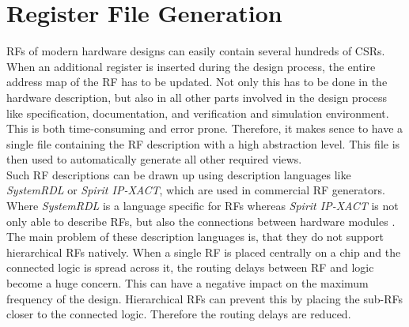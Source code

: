 \section{Register File Generation}
RFs of modern hardware designs can easily contain several hundreds of CSRs. When an additional register is inserted during the design process, the entire address map of the RF has to be updated. Not only this has to be done in the hardware description, but also in all other parts involved in the design process like specification, documentation, and verification and simulation environment. This is both time-consuming and error prone. Therefore, it makes sence to have a single file containing the RF description with a high abstraction level. This file is then used to automatically generate all other required views.\\

Such RF descriptions can be drawn up using description languages like \emph{SystemRDL} or \emph{Spirit IP-XACT}, which are used in commercial RF generators. Where \emph{SystemRDL} is a language specific for RFs \cite{system_rdl} whereas \emph{Spirit IP-XACT} is not only able to describe RFs, but also the connections between hardware modules \cite{ip_xact}.\\

The main problem of these description languages is, that they do not support hierarchical RFs natively. When a single RF is placed centrally on a chip and the connected logic is spread across it, the routing delays between RF and logic become a huge concern. This can have a negative impact on the maximum frequency of the design. Hierarchical RFs can prevent this by placing the sub-RFs closer to the connected logic. Therefore the routing delays are reduced.